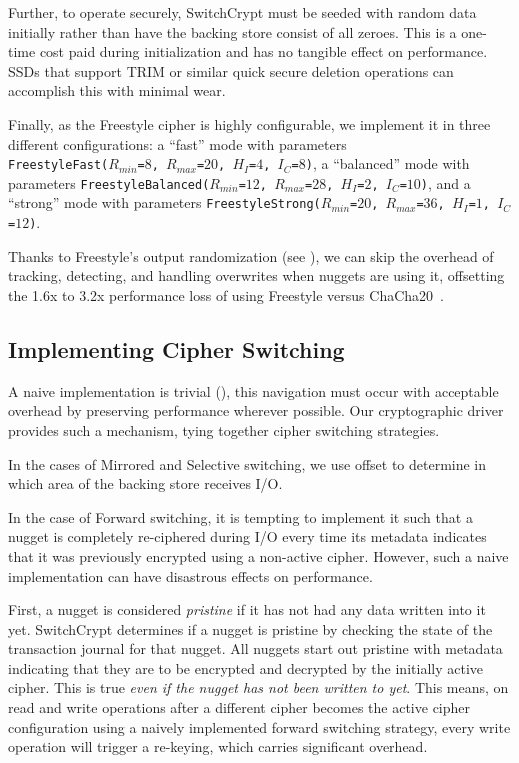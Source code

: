 Further, to operate securely, SwitchCrypt must be seeded with random data
initially rather than have the backing store consist of all zeroes. This is a
one-time cost paid during initialization and has no tangible effect on
performance. SSDs that support TRIM or similar quick secure deletion operations
can accomplish this with minimal wear.

Finally, as the Freestyle cipher is highly configurable, we implement it in
three different configurations: a ``fast'' mode with parameters
\\\texttt{FreestyleFast($R_{min}$=$8$, $R_{max}$=$20$, $H_I$=$4$, $I_C$=$8$)}, a
``balanced'' mode with parameters \texttt{FreestyleBalanced($R_{min}$=$12$,
$R_{max}$=$28$, $H_I$=$2$, $I_C$=$10$)}, and a ``strong'' mode with parameters
\texttt{FreestyleStrong($R_{min}$=$20$, $R_{max}$=$36$, $H_I$=$1$, $I_C$=$12$)}.

Thanks to Freestyle's output randomization (see ), we can skip
the overhead of tracking, detecting, and handling overwrites when nuggets are
using it, offsetting the 1.6x to 3.2x performance loss of using Freestyle versus
ChaCha20~\cite{Freestyle}.

\subsection{Implementing Cipher Switching}

A naive implementation is trivial (), this navigation must occur with acceptable overhead by preserving
performance wherever possible. Our cryptographic driver provides such a
mechanism, tying together cipher switching strategies.

In the cases of Mirrored and Selective switching, we use offset to determine in
which area of the backing store receives I/O.

In the case of Forward switching, it is tempting to implement it such that a
nugget is completely re-ciphered during I/O every time its metadata indicates
that it was previously encrypted using a non-active cipher. However, such a
naive implementation can have disastrous effects on performance.

First, a nugget is considered \emph{pristine} if it has not had any data written
into it yet. SwitchCrypt determines if a nugget is pristine by checking the
state of the transaction journal for that nugget. All nuggets start out pristine
with metadata indicating that they are to be encrypted and decrypted by the
initially active cipher. This is true \emph{even if the nugget has not been
written to yet}. This means, on read and write operations after a different
cipher becomes the active cipher configuration using a naively implemented
forward switching strategy, every write operation will trigger a re-keying,
which carries significant overhead.


